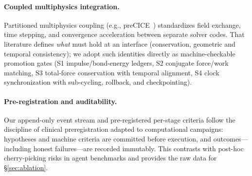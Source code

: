 \paragraph{Coupled multiphysics integration.}
Partitioned multiphysics coupling (e.g., preCICE~\cite{bungartz2016precice})
standardizes field exchange, time stepping, and convergence acceleration
between separate solver codes. That literature defines \emph{what} must
hold at an interface (conservation, geometric and temporal consistency);
we adopt such identities directly as machine-checkable promotion gates
(S1 impulse/bond-energy ledgers, S2 conjugate force/work matching, S3
total-force conservation with temporal alignment, S4 clock
synchronization with sub-cycling, rollback, and checkpointing).

\paragraph{Pre-registration and auditability.}
Our append-only event stream and pre-registered per-stage criteria
follow the discipline of clinical preregistration adapted to
computational campaigns: hypotheses and machine criteria are committed
before execution, and outcomes---including honest failures---are
recorded immutably. This contrasts with post-hoc cherry-picking risks
in agent benchmarks and provides the raw data for \S\ref{sec:ablation}.
